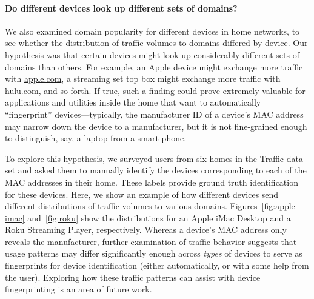 \paragraph{Do different devices look up different sets of domains?}  We
also examined domain popularity for different devices in home networks,
to see whether the distribution of traffic volumes to domains differed
by device.  Our hypothesis was that certain devices might look up
considerably different sets of domains than others. For example, an
Apple device might exchange more traffic with \url{apple.com}, a
streaming set top box might exchange more traffic with \url{hulu.com},
and so forth.  If true, such a finding could prove extremely valuable
for applications and utilities inside the home that want to
automatically ``fingerprint'' devices---typically, the manufacturer ID
of a device's MAC address may narrow down the device to a manufacturer,
but it is not fine-grained enough to distinguish, say, a laptop from a
smart phone.

To explore this hypothesis, we surveyed users from six homes in the 
Traffic data set and asked them to manually identify the devices
corresponding to each of the MAC addresses in their home.  These labels
provide ground truth identification for these devices.  Here, we show an
example of how different devices send different distributions of traffic
volumes to various domains.  Figures~\ref{fig:apple-imac}
and~\ref{fig:roku} show the distributions for an Apple iMac
Desktop and a Roku Streaming Player, respectively. Whereas a device's MAC address
only reveals the manufacturer, further examination of traffic behavior suggests that
usage patterns may differ significantly enough across {\em types} of devices to serve as
fingerprints for device identification (either automatically, or with
some help from the user).  Exploring how these traffic patterns can
assist with device fingerprinting is an area of future work.







